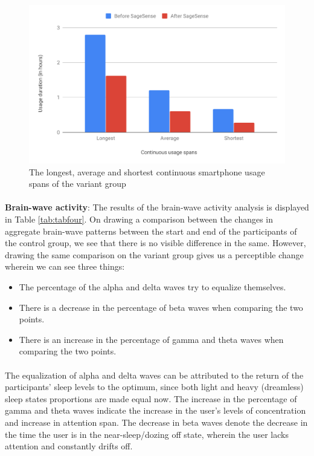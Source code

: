 \documentclass{article}
\begin{document}
\begin{figure}[hbtp]
    \centering
    \includegraphics[width=\textwidth]{ud-variant.pdf}
    \caption{The longest, average and shortest continuous smartphone usage spans of the variant group}
    \label{fig:udvar}
\end{figure}

\paragraph{} \textbf{Brain-wave activity}: The results of the brain-wave activity analysis is displayed in Table \ref{tab:tabfour}. On drawing a comparison between the changes in aggregate brain-wave patterns between the start and end of the participants of the control group, we see that there is no visible difference in the same. However, drawing the same comparison on the variant group gives us a perceptible change wherein we can see three things:

\begin{itemize}
    \item The percentage of the alpha and delta waves try to equalize themselves.
    \item There is a decrease in the percentage of beta waves when comparing the two points.
    \item There is an increase in the percentage of gamma and theta waves when comparing the two points.
\end{itemize}

\paragraph{} The equalization of alpha and delta waves can be attributed to the return of the participants' sleep levels to the optimum, since both light and heavy (dreamless) sleep states proportions are made equal now. The increase in the percentage of gamma and theta waves indicate the increase in the user's levels of concentration and increase in attention span. The decrease in beta waves denote the decrease in the time the user is in the near-sleep/dozing off state, wherein the user lacks attention and constantly drifts off.
\end{document}
